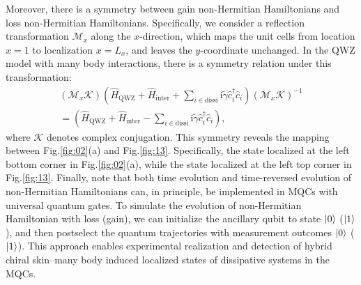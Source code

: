 \documentclass[longbibliography, aps, prx, amsmath, amssymb, amsfonts, twocolumn,superscriptaddress, footinbib]{revtex4-1}
\begin{document}
	Moreover, there is a symmetry between gain non-Hermitian Hamiltonians and loss non-Hermitian Hamiltonians. Specifically, we consider a reflection transformation $\mathcal{M}_x$ along the $x$-direction, which maps the unit cells from location $x = 1$ to localization $x = L_x$, and leaves the $y$-coordinate unchanged. In the QWZ model with many body interactions, there is a symmetry relation under this transformation:
	\begin{equation}
		\begin{split}
			(\mathcal{M}_x \mathcal{K})(\hat{H}_{\text{QWZ}} + \hat{H}_{\text{inter}} + \sum_{i\in \text{dissi}} \mathrm{i}\tilde{\gamma} \hat{c}_i^{\dagger} \hat{c}_i ) (\mathcal{M}_x \mathcal{K})^{-1} \\
			= (\hat{H}_{\text{QWZ}} + \hat{H}_{\text{inter}} - \sum_{i\in \text{dissi}} \mathrm{i}\tilde{\gamma} \hat{c}_i^{\dagger} \hat{c}_i),
		\end{split}
	\end{equation}
	where $\mathcal{K}$ denotes complex conjugation. This symmetry reveals the mapping between Fig.\ref{fig:02}(a) and Fig.\ref{fig:13}. Specifically, the state localized at the left bottom corner in Fig.\ref{fig:02}(a), while the state localized at the left top corner in Fig.\ref{fig:13}.
	Finally, note that both time evolution and time-reversed evolution of non-Hermitian Hamiltonians can, in principle, be implemented in MQCs with universal quantum gates. To simulate the evolution of non-Hermitian Hamiltonian with loss (gain), we can initialize the ancillary qubit to state $\ket{0}$ ($\ket{1}$), and then postselect the quantum trajectories with measurement outcomes $\ket{0}$ ($\ket{1}$). This approach enables experimental realization and detection of hybrid chiral skin–many body induced localized states of dissipative systems in the MQCs.
\end{document}
